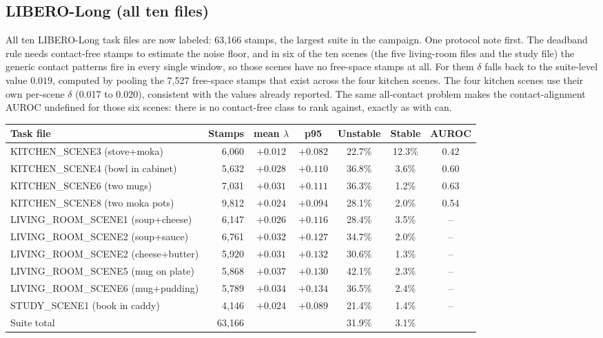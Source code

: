 \documentclass[11pt]{article}
\begin{document}
\subsection{LIBERO-Long (all ten files)}

All ten LIBERO-Long task files are now labeled: 63{,}166 stamps, the largest suite
in the campaign. One protocol note first. The deadband rule needs contact-free
stamps to estimate the noise floor, and in six of the ten scenes (the five
living-room files and the study file) the generic contact patterns fire in every
single window, so those scenes have no free-space stamps at all. For them $\delta$
falls back to the suite-level value $0.019$, computed by pooling the 7{,}527
free-space stamps that exist across the four kitchen scenes. The four kitchen
scenes use their own per-scene $\delta$ (0.017 to 0.020), consistent with the
values already reported. The same all-contact problem makes the contact-alignment
AUROC undefined for those six scenes: there is no contact-free class to rank
against, exactly as with can.

\begin{center}
\footnotesize
\begin{tabular}{@{}lrccccc@{}}
\toprule
Task file & Stamps & mean $\lambda$ & p95 & Unstable & Stable & AUROC \\
\midrule
KITCHEN\_SCENE3 (stove+moka) & 6{,}060 & $+0.012$ & $+0.082$ & 22.7\% & 12.3\% & 0.42 \\
KITCHEN\_SCENE4 (bowl in cabinet) & 5{,}632 & $+0.028$ & $+0.110$ & 36.8\% & 3.6\% & 0.60 \\
KITCHEN\_SCENE6 (two mugs) & 7{,}031 & $+0.031$ & $+0.111$ & 36.3\% & 1.2\% & 0.63 \\
KITCHEN\_SCENE8 (two moka pots) & 9{,}812 & $+0.024$ & $+0.094$ & 28.1\% & 2.0\% & 0.54 \\
LIVING\_ROOM\_SCENE1 (soup+cheese) & 6{,}147 & $+0.026$ & $+0.116$ & 28.4\% & 3.5\% & -- \\
LIVING\_ROOM\_SCENE2 (soup+sauce) & 6{,}761 & $+0.032$ & $+0.127$ & 34.7\% & 2.0\% & -- \\
LIVING\_ROOM\_SCENE2 (cheese+butter) & 5{,}920 & $+0.031$ & $+0.132$ & 30.6\% & 1.3\% & -- \\
LIVING\_ROOM\_SCENE5 (mug on plate) & 5{,}868 & $+0.037$ & $+0.130$ & 42.1\% & 2.3\% & -- \\
LIVING\_ROOM\_SCENE6 (mug+pudding) & 5{,}789 & $+0.034$ & $+0.134$ & 36.5\% & 2.4\% & -- \\
STUDY\_SCENE1 (book in caddy) & 4{,}146 & $+0.024$ & $+0.089$ & 21.4\% & 1.4\% & -- \\
\midrule
Suite total & 63{,}166 & & & 31.9\% & 3.1\% & \\
\bottomrule
\end{tabular}
\end{center}
\end{document}

